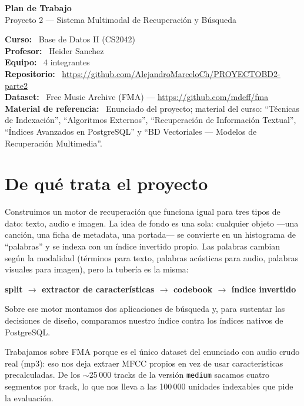 \documentclass[11pt]{article}
\newcommand{\campo}[1]{\textbf{#1:}\ }
\begin{document}
\begin{center}
  {\LARGE\bfseries Plan de Trabajo}\\[0.3em]
  {\large Proyecto 2 --- Sistema Multimodal de Recuperación y Búsqueda}
\end{center}

\vspace{0.4em}

\campo{Curso} Base de Datos II (CS2042) \\
\campo{Profesor} Heider Sanchez \\
\campo{Equipo} 4 integrantes \\
\campo{Repositorio} \url{https://github.com/AlejandroMarceloCh/PROYECTOBD2-parte2} \\
\campo{Dataset} Free Music Archive (FMA) --- \url{https://github.com/mdeff/fma} \\
\campo{Material de referencia} Enunciado del proyecto; material del curso: ``Técnicas de Indexación'', ``Algoritmos Externos'', ``Recuperación de Información Textual'', ``Índices Avanzados en PostgreSQL'' y ``BD Vectoriales --- Modelos de Recuperación Multimedia''.

\hrulefill

\section{De qué trata el proyecto}

Construimos un motor de recuperación que funciona igual para tres tipos de dato: texto, audio e imagen. La idea de fondo es una sola: cualquier objeto ---una canción, una ficha de metadata, una portada--- se convierte en un histograma de ``palabras'' y se indexa con un índice invertido propio. Las palabras cambian según la modalidad (términos para texto, palabras acústicas para audio, palabras visuales para imagen), pero la tubería es la misma:

\begin{center}
\textbf{split $\rightarrow$ extractor de características $\rightarrow$ codebook $\rightarrow$ índice invertido}
\end{center}

Sobre ese motor montamos dos aplicaciones de búsqueda y, para sustentar las decisiones de diseño, comparamos nuestro índice contra los índices nativos de PostgreSQL.

Trabajamos sobre FMA porque es el único dataset del enunciado con audio crudo real (mp3): eso nos deja extraer MFCC propios en vez de usar características precalculadas. De los $\sim$25\,000 tracks de la versión \texttt{medium} sacamos cuatro segmentos por track, lo que nos lleva a las 100\,000 unidades indexables que pide la evaluación.
\end{document}
